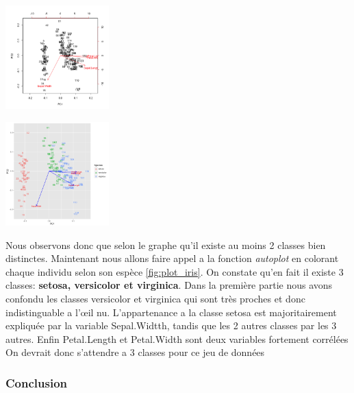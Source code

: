 \documentclass[10pt]{article}
\begin{document}
	
			\begin{minipage}{.5\textwidth}
			\includegraphics[width=40mm]{Figures/Iris_1/plotnospieces.png}
			\label{fig:plot_iris_nocol}
		\end{minipage}%
		\hspace{0.02\linewidth}
		\begin{minipage}{.5\textwidth}
			\includegraphics[width=40mm]{Figures/Iris_1/plotspieces.png}
		\label{fig:plot_iris}
		\end{minipage}
		\vspace{0.2mm}
		
	 
		Nous observons donc que selon le graphe qu'il existe au moins 2 classes bien distinctes. Maintenant nous allons faire appel a la fonction \textit{autoplot} en colorant chaque individu selon son espèce \ref{fig:plot_iris}. On constate qu'en fait il existe 3 classes: \textbf{setosa, versicolor et virginica}. Dans la première partie nous avons confondu les classes versicolor et virginica qui sont très proches et donc indistinguable a l'œil nu. L'appartenance a la classe setosa est majoritairement expliquée par la variable Sepal.Widtth, tandis que  les 2 autres classes par les 3 autres. Enfin Petal.Length et Petal.Width sont deux variables fortement corrélées On devrait donc s'attendre a 3 classes pour ce jeu de données
	
	\subsubsection{Conclusion}
	
\end{document}
